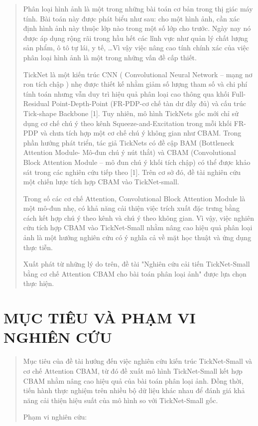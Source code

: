 \documentclass[
  12pt,
  a4paper,
]{report}
\begin{document}
\begin{quote}
Phân loại hình ảnh là một trong những bài toán cơ bản trong thị giác máy
tính. Bài toán này được phát biểu như sau: cho một hình ảnh, cần xác
định hình ảnh này thuộc lớp nào trong một số lớp cho trước. Ngày nay nó
được áp dụng rộng rãi trong hầu hết các lĩnh vực như quản lý chất lượng
sản phẩm, ô tô tự lái, y tế, \ldots Vì vậy việc nâng cao tính chính xác
của việc phân loại hình ảnh là một trong những vấn đề cấp thiết.

TickNet là một kiến trúc CNN ( Convolutional Neural Network -- mạng nơ
ron tích chập ) nhẹ được thiết kế nhằm giảm số lượng tham số và chi phí
tính toán nhưng vẫn duy trì hiệu quả phân loại cao thông qua khối
Full-Residual Point-Depth-Point (FR-PDP-cơ chế tàn dư đầy đủ) và cấu
trúc Tick-shape Backbone {[}1{]}. Tuy nhiên, mô hình TickNets gốc mới
chỉ sử dụng cơ chế chú ý theo kênh Squeeze-and-Excitation trong mỗi khối
FR-PDP và chưa tích hợp một cơ chế chú ý không gian như CBAM. Trong phần
hướng phát triển, tác giả TickNets có đề cập BAM (Bottleneck Attention
Module- Mô-đun chú ý nút thắt) và CBAM (Convolutional Block Attention
Module -- mô đun chú ý khối tích chập) có thể được khảo sát trong các
nghiên cứu tiếp theo {[}1{]}. Trên cơ sở đó, đề tài nghiên cứu một chiến
lược tích hợp CBAM vào TickNet-small.

Trong số các cơ chế Attention, Convolutional Block Attention Module là
một mô-đun nhẹ, có khả năng cải thiện việc trích xuất đặc trưng bằng
cách kết hợp chú ý theo kênh và chú ý theo không gian. Vì vậy, việc
nghiên cứu tích hợp CBAM vào TickNet-Small nhằm nâng cao hiệu quả phân
loại ảnh là một hướng nghiên cứu có ý nghĩa cả về mặt học thuật và ứng
dụng thực tiễn.

Xuất phát từ những lý do trên, đề tài "Nghiên cứu cải tiến TickNet-Small
bằng cơ chế Attention CBAM cho bài toán phân loại ảnh" được lựa chọn
thực hiện.
\end{quote}

\section{MỤC TIÊU VÀ PHẠM VI NGHIÊN
CỨU}\label{mux1ee5c-tiuxeau-vuxe0-phux1ea1m-vi-nghiuxean-cux1ee9u}

\begin{quote}
Mục tiêu của đề tài hướng đến việc nghiên cứu kiến trúc TickNet-Small và
cơ chế Attention CBAM, từ đó đề xuất mô hình TickNet-Small kết hợp CBAM
nhằm nâng cao hiệu quả của bài toán phân loại ảnh. Đồng thời, tiến hành
thực nghiệm trên nhiều bộ dữ liệu khác nhau để đánh giá khả năng cải
thiện hiệu suất của mô hình so với TickNet-Small gốc.

Phạm vi nghiên cứu:
\end{quote}
\end{document}
